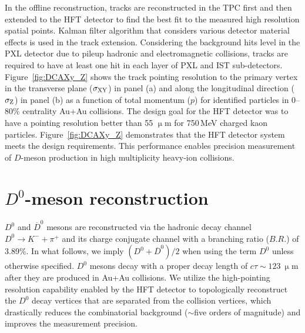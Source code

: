 \documentclass[%
 reprint,	
 amsmath,amssymb,
 aps,
 prc,
]{revtex4-1}
\begin{document}
In the offline reconstruction, tracks are reconstructed in the TPC first and then extended to the HFT detector to find the best fit to the measured high resolution spatial points. Kalman filter algorithm that considers various detector material effects is used in the track extension. Considering the background hits level in the PXL detector due to pileup hadronic and electromagnetic collisions, tracks are required to have at least one hit in each layer of PXL and IST sub-detectors. Figure~\ref{fig:DCAXy_Z} shows the track pointing resolution to the primary vertex in the transverse plane ($\sigma_{\rm XY}$) in panel (a) and along the longitudinal direction ($\sigma_{\rm Z}$) in panel (b) as a function of total momentum ($p$) for identified particles in 0--80\% centrality Au+Au collisions. The design goal for the HFT detector was to have a pointing resolution better than 55 $\upmu$m for 750\,MeV charged kaon particles. Figure~\ref{fig:DCAXy_Z} demonstrates that the HFT detector system meets the design requirements. This performance enables precision measurement of $D$-meson production in high multiplicity heavy-ion collisions.


\section{$D^0$-meson reconstruction}
\label{D0recon}

$D^0$ and $\overline{D}^{0}$ mesons are reconstructed via the hadronic decay channel $D^0\rightarrow K^-+\pi^+$ and its charge conjugate channel with a branching ratio ($B.R.$) of 3.89\%. In what follows, we imply $(D^0 +\overline{D}^{0})/2$ when using the term $D^0$ unless otherwise specified. $D^0$ mesons decay with a proper decay length of $c\tau\sim123\ \upmu$m after they are produced in Au+Au collisions. We utilize the high-pointing resolution capability enabled by the HFT detector to topologically reconstruct the $D^0$ decay vertices that are separated from the collision vertices, which drastically reduces the combinatorial background ($\sim$five orders of magnitude) and improves the measurement precision.
\end{document}
